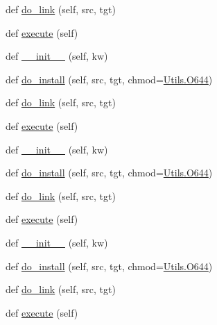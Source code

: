\begin{DoxyCompactItemize}
\item 
def \hyperlink{classwaflib_1_1_build_1_1_uninstall_context_a46252a8c474b628ac19e035c124f9e6b}{do\+\_\+link} (self, src, tgt)
\item 
def \hyperlink{classwaflib_1_1_build_1_1_uninstall_context_aadc84a51026ff5d9971566f29a0faaa8}{execute} (self)
\item 
def \hyperlink{classwaflib_1_1_build_1_1_uninstall_context_a4f1168ab484b0e1d748fefb5a6812b85}{\+\_\+\+\_\+init\+\_\+\+\_\+} (self, kw)
\item 
def \hyperlink{classwaflib_1_1_build_1_1_uninstall_context_a4b583a30eee0f110ab2b9b833aa00dd0}{do\+\_\+install} (self, src, tgt, chmod=\hyperlink{namespacewaflib_1_1_utils_ade9dd27fadbf52a0641bbff06d3dd3ac}{Utils.\+O644})
\item 
def \hyperlink{classwaflib_1_1_build_1_1_uninstall_context_a46252a8c474b628ac19e035c124f9e6b}{do\+\_\+link} (self, src, tgt)
\item 
def \hyperlink{classwaflib_1_1_build_1_1_uninstall_context_aadc84a51026ff5d9971566f29a0faaa8}{execute} (self)
\item 
def \hyperlink{classwaflib_1_1_build_1_1_uninstall_context_a4f1168ab484b0e1d748fefb5a6812b85}{\+\_\+\+\_\+init\+\_\+\+\_\+} (self, kw)
\item 
def \hyperlink{classwaflib_1_1_build_1_1_uninstall_context_a4b583a30eee0f110ab2b9b833aa00dd0}{do\+\_\+install} (self, src, tgt, chmod=\hyperlink{namespacewaflib_1_1_utils_ade9dd27fadbf52a0641bbff06d3dd3ac}{Utils.\+O644})
\item 
def \hyperlink{classwaflib_1_1_build_1_1_uninstall_context_a46252a8c474b628ac19e035c124f9e6b}{do\+\_\+link} (self, src, tgt)
\item 
def \hyperlink{classwaflib_1_1_build_1_1_uninstall_context_aadc84a51026ff5d9971566f29a0faaa8}{execute} (self)
\item 
def \hyperlink{classwaflib_1_1_build_1_1_uninstall_context_a4f1168ab484b0e1d748fefb5a6812b85}{\+\_\+\+\_\+init\+\_\+\+\_\+} (self, kw)
\item 
def \hyperlink{classwaflib_1_1_build_1_1_uninstall_context_a4b583a30eee0f110ab2b9b833aa00dd0}{do\+\_\+install} (self, src, tgt, chmod=\hyperlink{namespacewaflib_1_1_utils_ade9dd27fadbf52a0641bbff06d3dd3ac}{Utils.\+O644})
\item 
def \hyperlink{classwaflib_1_1_build_1_1_uninstall_context_a46252a8c474b628ac19e035c124f9e6b}{do\+\_\+link} (self, src, tgt)
\item 
def \hyperlink{classwaflib_1_1_build_1_1_uninstall_context_aadc84a51026ff5d9971566f29a0faaa8}{execute} (self)

\end{DoxyCompactItemize}
